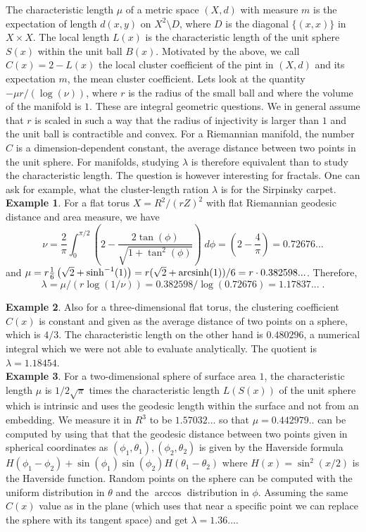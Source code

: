 \documentclass[12pt]{amsart}
\theoremstyle{definition}
\begin{document}
The characteristic length $\mu$ of a metric space $(X,d)$ with measure $m$
is the expectation of length $d(x,y)$ on $X^2 \setminus D$, where $D$ is the 
diagonal $\{ (x,x) \}$ in $X \times X$. The local length $L(x)$
is the characteristic length of the unit sphere $S(x)$ within the unit
ball $B(x)$. Motivated by the above, we call $C(x)=2-L(x)$ the local cluster coefficient
of the pint in $(X,d)$ and its expectation $m$, the mean cluster coefficient. 
Lets look at the quantity $-\mu r/(\log(\nu))$, where $r$ is the radius of the small ball and
where the volume of the manifold is $1$. These are integral geometric questions. We 
in general assume that $r$ is scaled in such a way that the radius of injectivity is 
larger than $1$ and the unit ball is contractible and convex. For a Riemannian manifold, the
number $C$ is a dimension-dependent constant, the average distance between two points in the
unit sphere. For manifolds, studying $\lambda$ is therefore equivalent than to study the 
characteristic length. The question is however interesting for fractals. One can ask for
example, what the cluster-length ration $\lambda$ is for the Sirpinsky carpet. \\

{\bf Example 1}. For a flat torus $X = R^2/(rZ)^2$ with flat Riemannian geodesic 
distance and area measure, we have 
$$ \nu = \frac{2}{\pi} \int_0^{\pi/2} (2-\frac{2 \tan(\phi)}{\sqrt{1+\tan^2(\phi)}}) \; d\phi 
     = (2-\frac{4}{\pi}) =  0.72676... $$
and $\mu =r \frac{1}{6} \left(\sqrt{2}+\sinh^{-1}(1)\right) 
         =r(\sqrt{2}+{\rm arcsinh}(1))/6 = r \cdot 0.382598...$. Therefore,
$$ \lambda = \mu/(r \log(1/\nu)) = 0.382598/\log(0.72676) = 1.17837 ... \;.  $$

{\bf Example 2}. Also for a three-dimensional flat torus, the clustering 
coefficient $C(x)$ is constant and given as the average distance of two points 
on a sphere, which is $4/3$. The characteristic length on the other hand is $0.480296$,
a numerical integral which we were not able to evaluate analytically. The
quotient is $\lambda = 1.18454$. \\

{\bf Example 3}. For a two-dimensional sphere of surface area $1$,
the characteristic length $\mu$ is $1/2\sqrt{\pi}$ times the characteristic
length $L(S(x))$ of the unit sphere which is intrinsic and
uses the geodesic length within the surface and not from an embedding. 
We measure it in $R^3$ to be $1.57032...$ so that $\mu=0.442979..$ can be computed 
by using that that the geodesic distance between
two points given in spherical coordinates as $(\phi_1,\theta_1),
(\phi_2,\theta_2)$ is given by the Haverside formula
$H(\phi_1-\phi_2) + \sin(\phi_1) \sin(\phi_2) H(\theta_1-\theta_2)$
where $H(x) = \sin^2(x/2)$ is the Haverside function. Random 
points on the sphere can be computed with the uniform distribution in $\theta$
and the $\arccos$ distribution in $\phi$. Assuming the same $C(x)$ value as in the plane 
(which uses that near a specific point we can replace the sphere with its
tangent space) and get $\lambda = 1.36 \dots $. 
\end{document}

